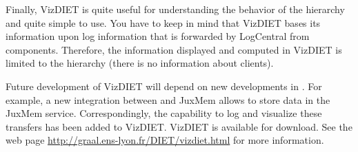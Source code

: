 Finally, VizDIET is quite useful for understanding the behavior of the \diet
hierarchy and quite simple to use. You have to keep in mind that VizDIET bases
its information upon log information that is forwarded by LogCentral from \diet
components. Therefore, the information displayed and computed in VizDIET is
limited to the \diet hierarchy (\eg there is no information about clients).

Future development of VizDIET will depend on new developments in \diet. For
example, a new integration between \diet and JuxMem allows \diet to store data
in the JuxMem service.  Correspondingly, the capability to log and visualize
these transfers has been added to VizDIET. VizDIET is available for
download. See the web page \url{http://graal.ens-lyon.fr/DIET/vizdiet.html} for
more information.



